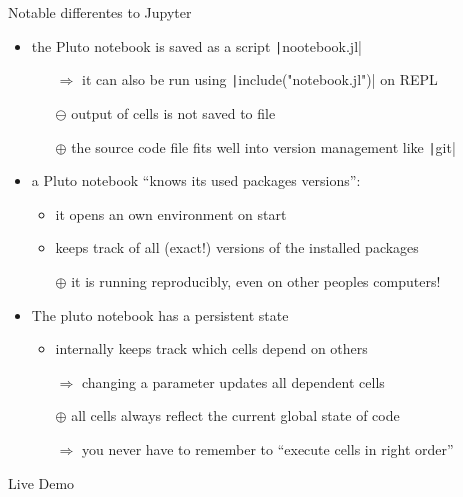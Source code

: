 \documentclass[aspectratio=169, 11pt, handout]{beamer}
\begin{document}
    \begin{frame}{Notable differentes to Jupyter}
        \begin{itemize}[<+->]
            \item the Pluto notebook is saved as a script \texttt|nootebook.jl|
            \begin{itemize}
                \item[$\Rightarrow$] it can also be run using \texttt|include("notebook.jl")| on REPL
                \item[{$\ominus$}] output of cells is not saved to file
                \item[{$\oplus$}] the source code file fits well into version management like \texttt|git|
            \end{itemize}
            \item a Pluto notebook “knows its used packages versions”:
            \begin{itemize}[<+->]
                \item it opens an own environment on start
                \item keeps track of all (exact!) versions of the installed packages
                \item[$\oplus$] it is running reproducibly, even on other peoples computers!
            \end{itemize}
            \item The pluto notebook has a \alert{persistent state}
            \begin{itemize}
                \item internally keeps track which cells depend on others
                \item[$\Rightarrow$] changing a parameter updates \alert{all} dependent cells
                \item[$\oplus$] all cells always reflect the current global state of code
                \item[$\Rightarrow$] you never have to remember to “execute cells in right order”
            \end{itemize}
        \end{itemize}
    \end{frame}
    \begin{frame}{Live Demo}
    \end{frame}
\end{document}
